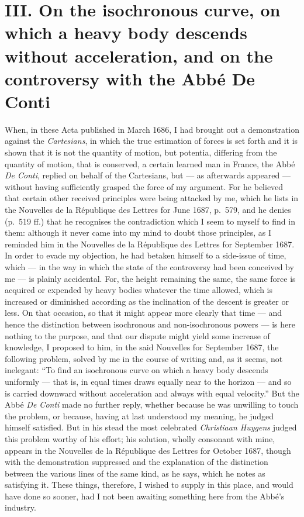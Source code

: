 \documentclass{article}
\begin{document}
\section*{III. On the isochronous curve, on which a heavy body descends without acceleration, and on the controversy with the Abbé De Conti}

When, in these Acta published in March 1686, I had brought out a demonstration against the
\emph{Cartesians}, in which the true estimation of forces is set forth and it is shown that it is
not the quantity of motion, but potentia, differing from the quantity of motion, that is
conserved, a
certain learned man in France, the Abbé \emph{De Conti}, replied on behalf of the Cartesians, but
— as afterwards appeared — without having sufficiently grasped the force of my argument. For he
believed that certain other received principles were being attacked by me, which he lists in the
Nouvelles de la République des Lettres for June 1687, p.~579, and he denies (p.~519 ff.) that he
recognises the contradiction which I seem to myself to find in them: although it never came into
my mind to doubt those principles, as I reminded him in the Nouvelles de la République des Lettres
for September 1687. In order to evade my objection, he had betaken himself to a side-issue of
time, which — in the way in which the state of the controversy had been conceived by me — is
plainly accidental. For, the height remaining the same, the same force is acquired or expended by
heavy bodies whatever the time allowed, which is increased or diminished according as the
inclination of the descent is greater or less. On that occasion, so that it might appear more
clearly that time — and hence the distinction between isochronous and non-isochronous powers — is
here nothing to the purpose, and that our dispute might yield some increase of knowledge, I
proposed to him, in the said Nouvelles for September 1687, the following problem, solved by me in
the course of writing and, as it seems, not inelegant: ``To find an isochronous curve on which a
heavy body descends uniformly — that is, in equal times draws equally near to the horizon — and so
is carried downward without acceleration and always with equal velocity.'' But the Abbé
\emph{De Conti} made no further reply, whether because he was unwilling to touch the problem, or
because, having at last understood my meaning, he judged himself satisfied. But in his stead the
most celebrated \emph{Christiaan Huygens} judged this problem worthy of his effort; his solution,
wholly consonant with mine, appears in the Nouvelles de la République des Lettres for October
1687, though with the demonstration suppressed and the explanation
of the distinction between the various lines of the same kind, as he says, which he notes as
satisfying it. These things, therefore, I wished to supply in this place, and would have done so
sooner, had I not been awaiting something here from the Abbé's industry.
\end{document}
